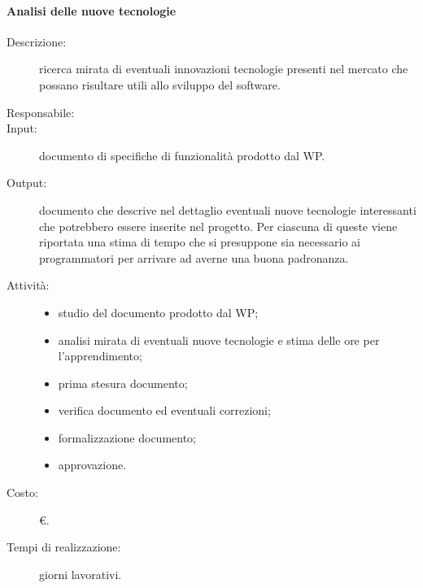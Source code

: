 \paragraph{Analisi delle nuove tecnologie}
\begin{description}
\item[Descrizione:] ricerca mirata di eventuali innovazioni tecnologie presenti nel mercato che possano risultare utili allo sviluppo del software.
\item[Responsabile:]
\item[Input:] documento di specifiche di funzionalità prodotto dal WP.
\item[Output:] documento che descrive nel dettaglio eventuali nuove tecnologie interessanti che potrebbero essere inserite nel progetto. Per ciascuna di queste viene riportata una stima di tempo che si presuppone sia necessario ai programmatori per arrivare ad averne una buona padronanza.
\item[Attività:]
\begin{itemize}
\item studio del documento prodotto dal WP;
\item analisi mirata di eventuali nuove tecnologie e stima delle ore per l'apprendimento;
\item prima stesura documento;
\item verifica documento ed eventuali correzioni;
\item formalizzazione documento;
\item approvazione.
\end{itemize}
\item[Costo:] \euro{}.
\item[Tempi di realizzazione:]  giorni lavorativi.
\end{description}

